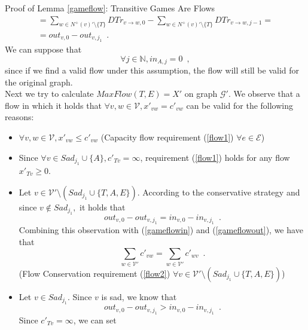 \begin{sepproof}{Proof of Lemma \ref{gameflow}: Transitive Games Are Flows}
\begin{equation}
\begin{gathered}
    = \sum\limits_{w \in N^{+}\left(v\right)' \setminus \{T\}}DTr_{v \rightarrow w, 0} -
    \sum\limits_{w \in N^{+}\left(v\right)' \setminus \{T\}}DTr_{v \rightarrow w, j-1} = \\
    = out_{v, 0} - out_{v, j_1} \enspace.
  \end{gathered}
  \end{equation}
  We can suppose that
  \begin{equation}
  \label{Aincoming}
    \forall j \in \mathbb{N}, in_{A, j} = 0 \enspace,
  \end{equation}
  since if we find a valid flow under this assumption, the flow will still be valid for the original graph. \\
  Next we try to calculate $MaxFlow\left(T, E\right) = X'$ on graph $\mathcal{G}'$. We observe that a flow in which it
  holds that $\forall v, w \in \mathcal{V}, x'_{vw} = c'_{vw}$ can be valid for the following reasons:
  \begin{itemize}
    \item $\forall v,w \in \mathcal{V}, x'_{vw} \leq c'_{vw}$ (Capacity flow requirement (\ref{flow1}) $\forall e \in
    \mathcal{E}$)
    \item Since $\forall v \in Sad_{j_1} \cup \{A\}, c'_{Tv} = \infty$, requirement (\ref{flow1}) holds for any flow
    $x'_{Tv} \geq 0$.
    \item Let $v \in \mathcal{V}' \setminus \left(Sad_{j_1} \cup \{T, A, E\}\right)$. According to the conservative
    strategy and since $v \notin Sad_{j_1},$ it holds that
    \begin{equation*}
      out_{v, 0} - out_{v, j_1} = in_{v, 0} - in_{v, j_1} \enspace.
    \end{equation*}
    Combining this observation with (\ref{gameflowin}) and (\ref{gameflowout}), we have that
    \begin{equation*}
      \sum\limits_{w \in \mathcal{V}'}c'_{vw} = \sum\limits_{w \in \mathcal{V}'}c'_{wv} \enspace.
    \end{equation*}
    (Flow Conservation requirement (\ref{flow2}) $\forall v \in \mathcal{V}' \setminus \left(Sad_{j_1}
    \cup \{T, A, E\}\right)$)
    \item Let $v \in Sad_{j_1}$. Since $v$ is sad, we know that
    \begin{equation*}
      out_{v, 0} - out_{v, j_1} > in_{v, 0} - in_{v, j_1} \enspace.
    \end{equation*}
    Since $c'_{Tv} = \infty$, we can set
    \begin{equation*}

\end{equation*}
\end{itemize}
\end{sepproof}
